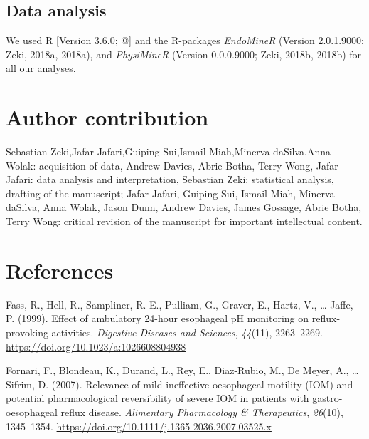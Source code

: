 \documentclass[english,man,floatsintext]{apa6}
\begin{document}
\hypertarget{data-analysis}{%
\subsection{Data analysis}\label{data-analysis}}

We used R {[}Version 3.6.0; @{]} and the R-packages \emph{EndoMineR} (Version 2.0.1.9000; Zeki, 2018a, 2018a), and \emph{PhysiMineR} (Version 0.0.0.9000; Zeki, 2018b, 2018b) for all our analyses.

\newpage

\hypertarget{author-contribution}{%
\section{Author contribution}\label{author-contribution}}

Sebastian Zeki,Jafar Jafari,Guiping Sui,Ismail Miah,Minerva daSilva,Anna Wolak: acquisition of data, Andrew Davies, Abrie Botha, Terry Wong, Jafar Jafari: data analysis and interpretation, Sebastian Zeki: statistical analysis, drafting of the manuscript; Jafar Jafari, Guiping Sui, Ismail Miah, Minerva daSilva, Anna Wolak, Jason Dunn, Andrew Davies, James Gossage, Abrie Botha, Terry Wong: critical revision of the manuscript for important intellectual content.

\hypertarget{references}{%
\section{References}\label{references}}

\begingroup
\setlength{\parindent}{-0.5in}
\setlength{\leftskip}{0.5in}

\hypertarget{refs}{}
\leavevmode\hypertarget{ref-Fass1999}{}%
Fass, R., Hell, R., Sampliner, R. E., Pulliam, G., Graver, E., Hartz, V., \ldots{} Jaffe, P. (1999). Effect of ambulatory 24-hour esophageal pH monitoring on reflux-provoking activities. \emph{Digestive Diseases and Sciences}, \emph{44}(11), 2263--2269. \url{https://doi.org/10.1023/a:1026608804938}

\leavevmode\hypertarget{ref-FORNARI2007}{}%
Fornari, F., Blondeau, K., Durand, L., Rey, E., Diaz-Rubio, M., De Meyer, A., \ldots{} Sifrim, D. (2007). Relevance of mild ineffective oesophageal motility (IOM) and potential pharmacological reversibility of severe IOM in patients with gastro-oesophageal reflux disease. \emph{Alimentary Pharmacology \& Therapeutics}, \emph{26}(10), 1345--1354. \url{https://doi.org/10.1111/j.1365-2036.2007.03525.x}
\end{document}

